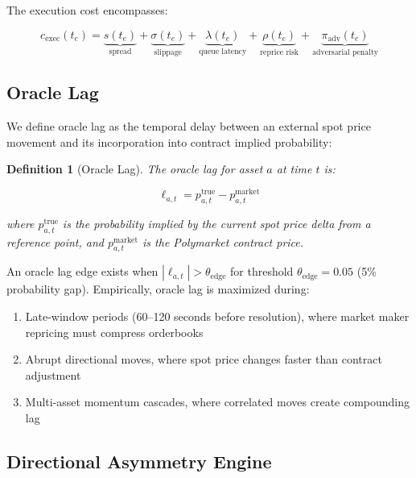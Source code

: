 \documentclass[11pt,a4paper]{article}
\newtheorem{definition}{Definition}[section]
\begin{document}
The execution cost encompasses:

\begin{equation}\label{eq:execution_cost}
    c_{\text{exec}}(t_e) = \underbrace{s(t_e)}_{\text{spread}} + \underbrace{\sigma(t_e)}_{\text{slippage}} + \underbrace{\lambda(t_e)}_{\text{queue latency}} + \underbrace{\rho(t_e)}_{\text{reprice risk}} + \underbrace{\pi_{\text{adv}}(t_e)}_{\text{adversarial penalty}}
\end{equation}

\subsection{Oracle Lag}

We define oracle lag as the temporal delay between an external spot price movement and its incorporation into contract implied probability:

\begin{definition}[Oracle Lag]
The \emph{oracle lag} for asset $a$ at time $t$ is:

\begin{equation}\label{eq:oracle_lag}
    \ell_{a,t} = p^{\text{true}}_{a,t} - p^{\text{market}}_{a,t}
\end{equation}

\noindent where $p^{\text{true}}_{a,t}$ is the probability implied by the current spot price delta from a reference point, and $p^{\text{market}}_{a,t}$ is the Polymarket contract price.
\end{definition}

An oracle lag edge exists when $|\ell_{a,t}| > \theta_{\text{edge}}$ for threshold $\theta_{\text{edge}} = 0.05$ (5\% probability gap). Empirically, oracle lag is maximized during:

\begin{enumerate}
    \item Late-window periods (60--120 seconds before resolution), where market maker repricing must compress orderbooks
    \item Abrupt directional moves, where spot price changes faster than contract adjustment
    \item Multi-asset momentum cascades, where correlated moves create compounding lag
\end{enumerate}

\subsection{Directional Asymmetry Engine}
\end{document}
